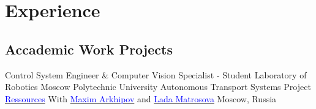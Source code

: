 \section{Experience}

\vspace{1mm}
\subsection{\textbf{Accademic Work Projects}}

    {Control System Engineer \& Computer Vision Specialist - Student}
    {Laboratory of Robotics Moscow Polytechnic University}
    {
    \newline
    Autonomous Transport Systems Project
    \href{https://disk.yandex.ru/d/LFgKC8DGddJJog}{\textcolor{blue}{Ressources}} With \href{https://vk.com/id194268921}{\textcolor{blue}{Maxim Arkhipov}} and \href{https://vk.com/id104681675}{\textcolor{blue}{Lada Matrosova}}}
    {Moscow, Russia}
